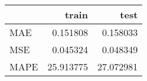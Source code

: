 \begin{tabular}{lrr}
\toprule
{} &      train &       test \\
\midrule
MAE  &   0.151808 &   0.158033 \\
MSE  &   0.045324 &   0.048349 \\
MAPE &  25.913775 &  27.072981 \\
\bottomrule
\end{tabular}
